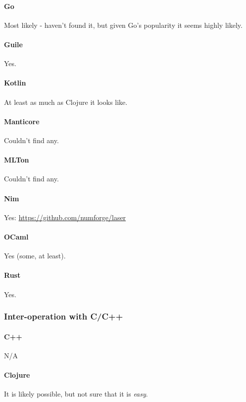 \paragraph{Go}
Most likely - haven't found it, but given Go's popularity it seems highly likely.

\paragraph{Guile}
Yes.

\paragraph{Kotlin}
At least as much as Clojure it looks like.

\paragraph{Manticore}
Couldn't find any.

\paragraph{MLTon}
Couldn't find any.

\paragraph{Nim}
Yes: \url{https://github.com/numforge/laser}

\paragraph{OCaml}
Yes (some, at least).


\paragraph{Rust}
Yes.


\subsubsection{Inter-operation with C/C++}

\paragraph{C++}
N/A

\paragraph{Clojure}
It is likely possible, but not sure that it is \emph{easy}.

